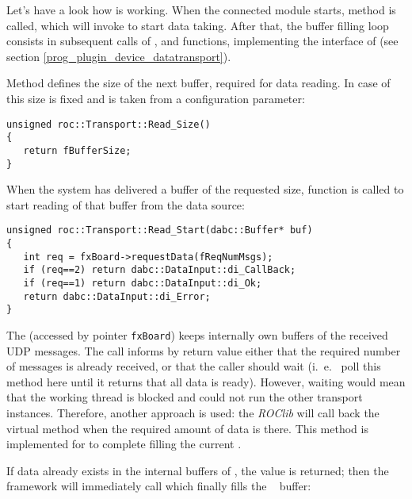Let's have a look how  is working.
When the connected module starts, method  is called,
which will invoke  to start data taking. 
After that, the buffer filling loop consists in subsequent calls of ,  and 
functions, implementing the interface of  
(see section \ref{prog_plugin_device_datatransport}). 

Method  defines the size of the next buffer, 
required for data reading. In case of  this size
is fixed and is taken from a configuration parameter:  

\begin{small}
\begin{verbatim}
unsigned roc::Transport::Read_Size()
{
   return fBufferSize;
}
\end{verbatim}
\end{small}
    
When the system has delivered a buffer of the requested size,  
function  is called to start reading 
of that buffer from the data source:

\begin{small}
\begin{verbatim}
unsigned roc::Transport::Read_Start(dabc::Buffer* buf)
{
   int req = fxBoard->requestData(fReqNumMsgs);
   if (req==2) return dabc::DataInput::di_CallBack;
   if (req==1) return dabc::DataInput::di_Ok;
   return dabc::DataInput::di_Error;
}
\end{verbatim}
\end{small}

The  (accessed by pointer {\tt fxBoard})
keeps internally  own buffers of the received UDP messages.
The call  informs by return value
either that the required number of messages is already received,
or that the caller should wait (i.~e.~ poll this method here until
it returns that all data is ready). 
However, waiting would mean that the working thread is blocked and 
could not run the other transport instances. Therefore, another approach is used: 
the {\em ROClib} will call back the virtual method   
when the required amount of data is there. This method
is implemented for  to complete filling the current
.

If data already exists in the internal buffers of ,
the value  
is returned; then the  framework will immediately call  which finally fills the \dabc~ buffer:

